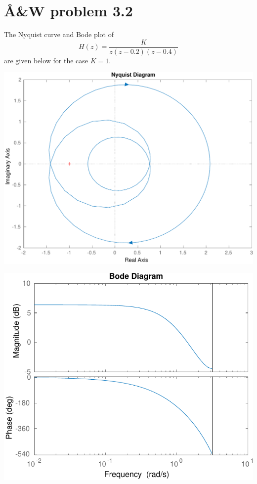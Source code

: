 \documentclass{scrartcl}
\title{}
\author{}
\date{}
\begin{document}
\section*{Å\&W problem 3.2}
\label{sec-1}

The Nyquist curve and Bode plot of 
\[ H(z) = \frac{K}{z(z-0.2)(z-0.4)} \]
are given below for the case $K=1$.
\begin{center}
\includegraphics[width=0.6\linewidth]{AW32_nyq-crop}
\end{center}
\begin{center}
\includegraphics[width=0.8\linewidth]{AW32_bode-crop}
\end{center}
\end{document}

